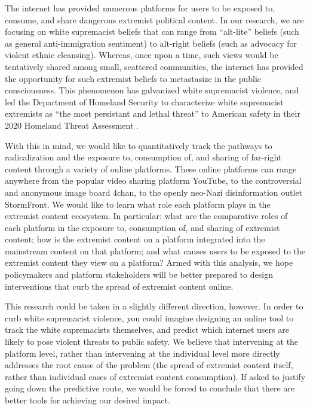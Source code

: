 \documentclass[12pt]{article}
\begin{document}
        The internet has provided numerous platforms for users to be exposed to, consume, and share dangerous extremist political content. In our research, we are focusing on white supremacist beliefs that can range from ``alt-lite'' beliefs (such as general anti-immigration sentiment) to alt-right beliefs (such as advocacy for violent ethnic cleansing). Whereas, once upon a time, such views would be tentatively shared among small, scattered communities, the internet has provided the opportunity for such extremist beliefs to metastasize in the public consciousness. This phenomenon has galvanized white supremacist violence, and led the Department of Homeland Security to characterize white supremacist extremists as “the most persistant and lethal threat” to American safety in their 2020 Homeland Threat Assessment \cite{dhs}. 

        With this in mind, we would like to quantitatively track the pathways to radicalization and the exposure to, consumption of, and sharing of far-right content through a variety of online platforms. These online platforms can range anywhere from the popular video sharing platform YouTube, to the controversial and anonymous image board 4chan, to the openly neo-Nazi disinformation outlet StormFront. We would like to learn what role each platform plays in the extremist content ecosystem. In particular: what are the comparative roles of each platform in the exposure to, consumption of, and sharing of extremist content; how is the extremist content on a platform integrated into the mainstream content on that platform; and what causes users to be exposed to the extremist content they view on a platform? Armed with this analysis, we hope policymakers and platform stakeholders will be better prepared to design interventions that curb the spread of extremist content online. 

        This research could be taken in a slightly different direction, however. In order to curb white supremacist violence, you could imagine designing an online tool to track the white supremacists themselves, and predict which internet users are likely to pose violent threats to public safety. We believe that intervening at the platform level, rather than intervening at the individual level more directly addresses the root cause of the problem (the spread of extremist content itself, rather than individual cases of extremist content consumption). If asked to justify going down the predictive route, we would be forced to conclude that there are better tools for achieving our desired impact.
\end{document}
